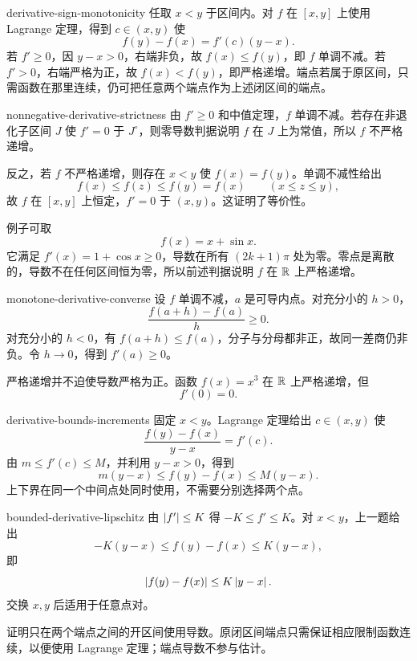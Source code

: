 \begin{solution}{derivative-sign-monotonicity}
任取 \(x<y\) 于区间内。对 \(f\) 在 \([x,y]\) 上使用 Lagrange 定理，得到 \(c\in(x,y)\) 使
\[
 f(y)-f(x)=f'(c)(y-x).
\]
若 \(f'\ge0\)，因 \(y-x>0\)，右端非负，故 \(f(x)\le f(y)\)，即 \(f\) 单调不减。若 \(f'>0\)，右端严格为正，故 \(f(x)<f(y)\)，即严格递增。端点若属于原区间，只需函数在那里连续，仍可把任意两个端点作为上述闭区间的端点。
\end{solution}

\begin{solution}{nonnegative-derivative-strictness}
由 \(f'\ge0\) 和中值定理，\(f\) 单调不减。若存在非退化子区间 \(J\) 使 \(f'=0\) 于 \(J^\circ\)，则零导数判据说明 \(f\) 在 \(J\) 上为常值，所以 \(f\) 不严格递增。

反之，若 \(f\) 不严格递增，则存在 \(x<y\) 使 \(f(x)=f(y)\)。单调不减性给出
\[
 f(x)\le f(z)\le f(y)=f(x)\qquad(x\le z\le y),
\]
故 \(f\) 在 \([x,y]\) 上恒定，\(f'=0\) 于 \((x,y)\)。这证明了等价性。

例子可取
\[
 f(x)=x+\sin x.
\]
它满足 \(f'(x)=1+\cos x\ge0\)，导数在所有 \((2k+1)\pi\) 处为零。零点是离散的，导数不在任何区间恒为零，所以前述判据说明 \(f\) 在 \(\mathbb{R}\) 上严格递增。
\end{solution}

\begin{solution}{monotone-derivative-converse}
设 \(f\) 单调不减，\(a\) 是可导内点。对充分小的 \(h>0\)，
\[
 \frac{f(a+h)-f(a)}h\ge0.
\]
对充分小的 \(h<0\)，有 \(f(a+h)\le f(a)\)，分子与分母都非正，故同一差商仍非负。令 \(h\to0\)，得到 \(f'(a)\ge0\)。

严格递增并不迫使导数严格为正。函数 \(f(x)=x^3\) 在 \(\mathbb{R}\) 上严格递增，但
\[
 f'(0)=0.
\]
\end{solution}

\begin{solution}{derivative-bounds-increments}
固定 \(x<y\)。Lagrange 定理给出 \(c\in(x,y)\) 使
\[
 \frac{f(y)-f(x)}{y-x}=f'(c).
\]
由 \(m\le f'(c)\le M\)，并利用 \(y-x>0\)，得到
\[
 m(y-x)\le f(y)-f(x)\le M(y-x).
\]
上下界在同一个中间点处同时使用，不需要分别选择两个点。
\end{solution}

\begin{solution}{bounded-derivative-lipschitz}
由 \(\left|f'\right|\le K\) 得 \(-K\le f'\le K\)。对 \(x<y\)，上一题给出
\[
 -K(y-x)\le f(y)-f(x)\le K(y-x),
\]
即
\[
 \left|f(y)-f(x)\right|\le K\left|y-x\right|.
\]
交换 \(x,y\) 后适用于任意点对。

证明只在两个端点之间的开区间使用导数。原闭区间端点只需保证相应限制函数连续，以便使用 Lagrange 定理；端点导数不参与估计。
\end{solution}

